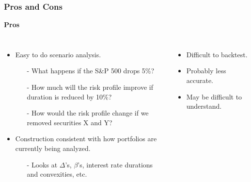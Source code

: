 \documentclass{beamer}
\begin{document}
\begin{frame}
\frametitle{Pros and Cons}

{\bf Pros}\hspace{0.5\textwidth}{\bf Cons}

\begin{columns}
\begin{itemize}
\item Easy to do scenario analysis.
\begin{enumerate}
\item[-] What happens if the S\&P 500 drops 5\%?
\item[-] How much will the risk profile improve if duration is reduced by 10\%?
\item[-] How would the risk profile change if we removed securities X and Y?
\end{enumerate}
\item Construction consistent with how portfolios are currently being analyzed.
\begin{enumerate}
\item[-] Looks at $\Delta$'s, $\beta$'s, interest rate durations and convexities, etc.
\end{enumerate}
\end{itemize}
\begin{itemize}
\item Difficult to backtest.
\item Probably less accurate. 
\item May be difficult to understand. 
\end{itemize}
\end{columns}

\end{frame}


\begin{frame}

\end{frame}
\end{document}

